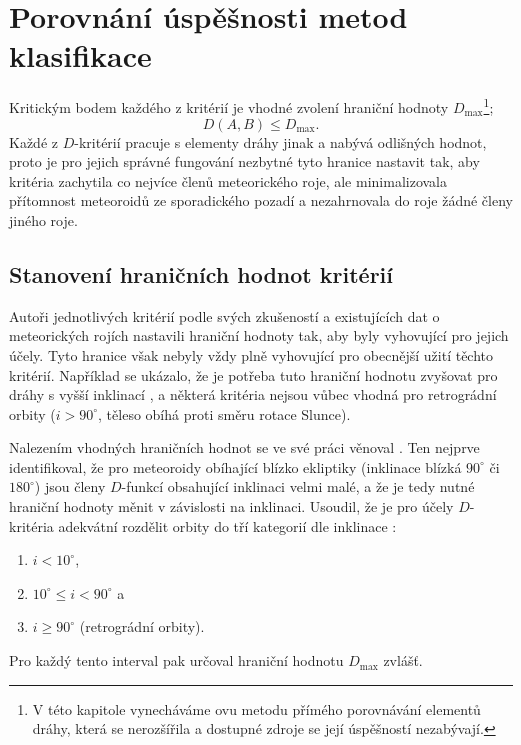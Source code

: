 \chapter{Porovnání úspěšnosti metod klasifikace\label{cpt:compare}}%
Kritickým bodem každého z kritérií je vhodné zvolení hraniční hodnoty $D_\text{max}$\footnote{V této kapitole vynecháváme \citeauthor{radiosurvey}ovu metodu přímého porovnávání elementů dráhy, která se nerozšířila a dostupné zdroje se její úspěšností nezabývají.};
$$
    D(A,B)\le D_\text{max}\text{.}
$$
Každé z $D$-kritérií pracuje s elementy dráhy jinak a nabývá odlišných hodnot, proto je pro jejich správné fungování nezbytné tyto hranice nastavit tak, aby kritéria zachytila co nejvíce členů meteorického roje, ale minimalizovala přítomnost meteoroidů ze sporadického pozadí a nezahrnovala do roje žádné členy jiného roje.

\section{Stanovení hraničních hodnot kritérií}%

Autoři jednotlivých kritérií podle svých zkušeností a existujících dat o meteorických rojích nastavili hraniční hodnoty tak, aby byly vyhovující pro jejich účely. Tyto hranice však nebyly vždy plně vyhovující pro obecnější užití těchto kritérií. Například se ukázalo, že je potřeba tuto hraniční hodnotu zvyšovat pro dráhy s vyšší inklinací \cite{galligan}, a některá kritéria nejsou vůbec vhodná pro retrográdní orbity \cite{galligan} ($i>90^\circ$, těleso obíhá proti směru rotace Slunce).

\medskip

Nalezením vhodných hraničních hodnot se ve své práci \cite{galligan} věnoval \citeauthor{galligan}. Ten nejprve identifikoval, že pro meteoroidy obíhající blízko ekliptiky (inklinace blízká $90^\circ$ či $180^\circ$) jsou členy $D$-funkcí obsahující inklinaci velmi malé, a že je tedy nutné hraniční hodnoty měnit v závislosti na inklinaci. Usoudil, že je pro účely $D$-kritéria adekvátní rozdělit orbity do tří kategorií dle inklinace \cite{galligan}:
\begin{enumerate}
    \item \hspace{1cm} $i < 10^\circ$,
    \item \hspace{1cm} $10^\circ \le i < 90^\circ$ a
    \item \hspace{1cm} $i \ge 90^\circ$ (retrográdní orbity).
\end{enumerate}
Pro každý tento interval pak určoval hraniční hodnotu $D_\text{max}$ zvlášť.

